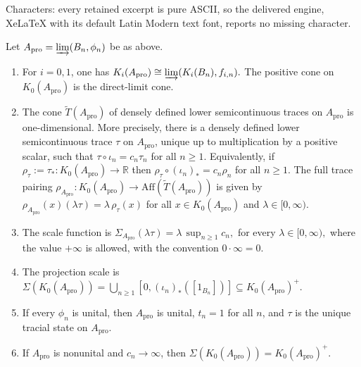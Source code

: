 \documentclass[10pt,a4paper]{amsart}
\newcommand{\Aff}{\mathrm{Aff}}
\newcommand{\ex}{\mathrm{pro}}
\begin{document}
Characters: every retained excerpt is pure ASCII, so the delivered engine, XeLaTeX with its default Latin Modern text font, reports no missing character.
\begin{theorem}
\label{thm:protorus-invariant}
Let $A_{\ex}=\varinjlim(B_n,\phi_n)$
be as above. 
\begin{enumerate}[label={\rm(\roman*)}]
\item For \(i=0,1\), one has $K_i(A_{\ex})\cong \varinjlim(K_i(B_n),f_{i,n}).$ The positive cone on \(K_0(A_{\ex})\) is the direct-limit cone.

\item The cone \(\widetilde T(A_{\ex})\) of densely defined lower semicontinuous
traces on \(A_{\ex}\) is one-dimensional. More precisely, there is a densely
defined lower semicontinuous trace \(\tau\) on \(A_{\ex}\), unique up to
multiplication by a positive scalar, such that $\tau\circ\iota_n=c_n\tau_n$
for all $n\geq 1$.
Equivalently, if $\rho_\tau:=\tau_*\colon K_0(A_{\ex})\to\mathbb R$
then $\rho_\tau\circ(\iota_n)_*=c_n\rho_n$ for all $n\geq 1$.
The full trace pairing $\rho_{A_{\ex}}\colon K_0(A_{\ex})\to \Aff(\widetilde T(A_{\ex}))$
is given by $\rho_{A_{\ex}}(x)(\lambda\tau)=\lambda\,\rho_\tau(x)$ for all
$x\in K_0(A_{\ex})$ and $\lambda\in[0,\infty).$

\item The scale function is $\Sigma_{A_{\ex}}(\lambda\tau)
=
\lambda\,\sup_{n\geq 1}c_n,$ for every $
\lambda\in[0,\infty),$
where the value \(+\infty\) is allowed, with the convention $0\cdot\infty=0$.

\item The projection scale is $\Sigma(K_0(A_{\ex}))
=
\bigcup_{n\geq 1}
[0,(\iota_n)_*([1_{B_n}])]
\subseteq K_0(A_{\ex})^+.$

\item If every $\phi_n$ is unital, then $A_{\ex}$ is unital,
$t_n=1$ for all $n$, and $\tau$ is the unique tracial state on
$A_{\ex}$.

\item If \(A_{\ex}\) is nonunital and \(c_n\to\infty\), then $\Sigma(K_0(A_{\ex}))=K_0(A_{\ex})^+.$
\end{enumerate}
\end{theorem}
\end{document}

